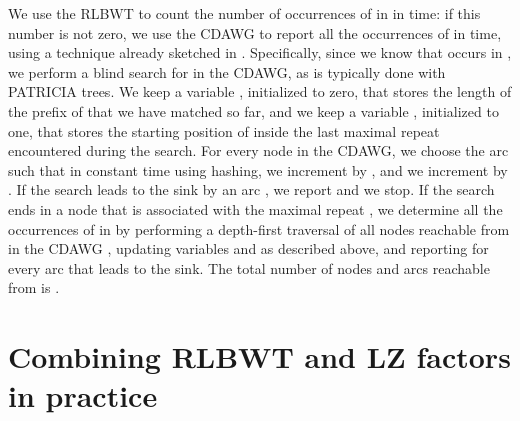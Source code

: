\documentclass[a4paper,UKenglish]{lipics-v2016}
\begin{document}
We use the RLBWT to count the number of occurrences of  in  in  time: if this number is not zero, we use the CDAWG to report all the  occurrences of  in  time, using a technique already sketched in \cite{crochemore1997automata}. Specifically, since we know that  occurs in , we perform a blind search for  in the CDAWG, as is typically done with PATRICIA trees. We keep a variable , initialized to zero, that stores the length of the prefix of  that we have matched so far, and we keep a variable , initialized to one, that stores the starting position of  inside the last maximal repeat encountered during the search. For every node  in the CDAWG, we choose the arc  such that  in constant time using hashing, we increment  by , and we increment  by . If the search leads to the sink by an arc , we report  and we stop. If the search ends in a node  that is associated with the maximal repeat , we determine all the occurrences of  in  by performing a depth-first traversal of all nodes reachable from  in the CDAWG , updating variables  and  as described above, and reporting  for every arc  that leads to the sink. The total number of nodes and arcs reachable from  is .












































\section{Combining RLBWT and LZ factors in practice}
\end{document}
